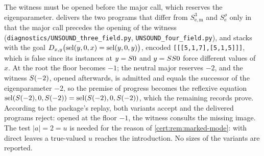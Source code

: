 
\begin{remark}\label{cert:rem:floor-order}
The witness must be opened before the major call, which reserves the eigenparameter.
 delivers the two programs that differ from $S^{3}_{\mathrm{e,m}}$
and $S^{\rho}_{\mathrm e}$ only in that the major call precedes the opening of the
witness (\texttt{diagnostics/UNSOUND\_three\_field.py},
\texttt{UNSOUND\_four\_field.py}), and stacks with the goal
$D_{x,y}\bigl(\operatorname{sel}(y,0,x)=\operatorname{sel}(y,0,y)\bigr)$, encoded
\texttt{[[[5,1,7],[5,1,5]]]}, which is false since its instances at $y=S 0$ and
$y=SS 0$ force different values of $x$. At the root the floor becomes $-1$; the
neutral major reserves $-2$, and the witness $S(-2)$, opened afterwards, is admitted
and equals the successor of the eigenparameter $-2$, so the premise of progress becomes
the reflexive equation $\operatorname{sel}(S(-2),0,S(-2))=\operatorname{sel}(S(-2),0,S(-2))$, which the
remaining records prove. According to the package's replay, both variants accept and
the delivered programs reject: opened at the floor $-1$, the witness consults the
missing image. The test $\lvert a\rvert=2=u$ is needed for the reason of
\cref{cert:rem:marked-mode}: with direct leaves a true-valued $u$ reaches the
introduction. No sizes of the variants are reported.
\end{remark}

